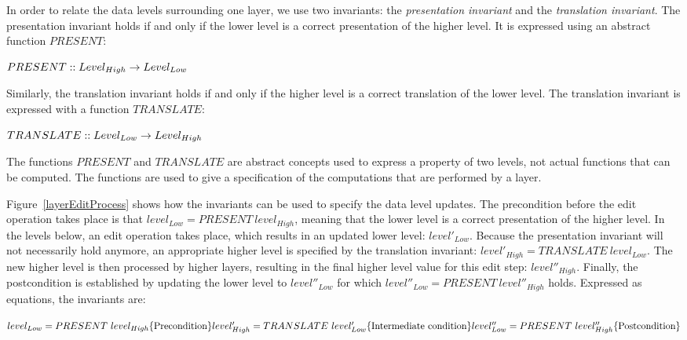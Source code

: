 
In order to relate the data levels surrounding one layer, we use two invariants: the {\em presentation invariant} and the {\em translation invariant}. The presentation invariant holds if and only if the lower level is a correct presentation of the higher level. It is expressed using an abstract function $PRESENT$:

\begin{math}
PRESENT :: Level_{High} \rightarrow Level_{Low} \\
\end{math}

Similarly, the translation invariant holds if and only if the higher level is a correct translation of the lower level. The translation invariant is expressed with a function $TRANSLATE$:

\begin{math}
TRANSLATE ::  Level_{Low} \rightarrow Level_{High} \\
\end{math}

The functions $PRESENT$ and $TRANSLATE$ are abstract concepts used to express a property of two levels, not actual functions that can be computed. The functions are used to give a specification of the computations that are performed by a layer.

Figure~\ref{layerEditProcess} shows how the invariants can be used to specify the data level updates. The precondition before the edit operation takes place is that $level_{Low} = PRESENT~level_{High}$, meaning that the lower level is a correct presentation of the higher level. In the levels below, an edit operation takes place, which results in an updated lower level: $level'_{Low}$. Because the presentation invariant will not necessarily hold anymore, an appropriate higher level is specified by the translation invariant:
$level'_{High} = TRANSLATE~level_{Low}$. The new higher level is then processed by higher layers, resulting in the final higher level value for this edit step: $level''_{High}$. Finally, the postcondition is established by updating the lower level to $level''_{Low}$ for which 
$level''_{Low} = PRESENT~level''_{High}$ holds. Expressed as equations, the invariants  are:

\begin{math}
level_{Low} = PRESENT~level_{High}\hfill \text{\{Precondition\}}\\
level'_{High} = TRANSLATE~level'_{Low}\hfill \text{\{Intermediate condition\}}\\
level''_{Low} = PRESENT~level''_{High}\hfill \text{\{Postcondition\}}\\
\end{math}

